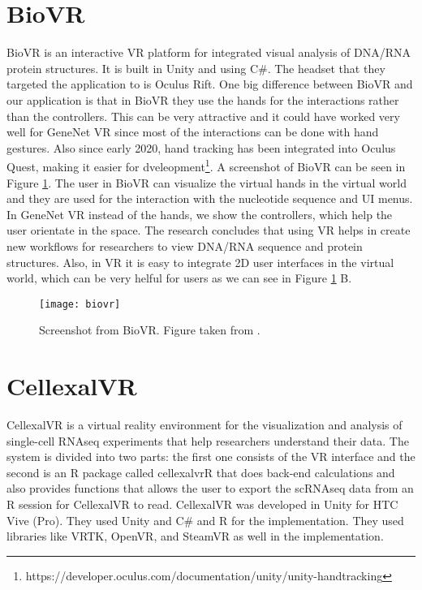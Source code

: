 \section{BioVR}
BioVR is an interactive VR platform for integrated visual analysis of DNA/RNA protein structures\cite{biovr}. It is built in Unity and using C\#. The headset that they targeted the application to is Oculus Rift. One big difference between BioVR and our application is that in BioVR they use the hands for the interactions rather than the controllers. This can be very attractive and it could have worked very well for GeneNet VR since most of the interactions can be done with hand gestures. Also since early 2020, hand tracking has been integrated into Oculus Quest, making it easier for dveleopment\footnote{https://developer.oculus.com/documentation/unity/unity-handtracking}.
A screenshot of BioVR can be seen in Figure \ref{fig:biovr}. The user in BioVR can visualize the virtual hands in the virtual world and they are used for the interaction with the nucleotide sequence and UI menus. In GeneNet VR instead of the hands, we show the controllers, which help the user orientate in the space. The research concludes that using VR helps in create new workflows for researchers to view DNA/RNA sequence and protein structures. Also, in VR it is easy to integrate 2D user interfaces in the virtual world, which can be very helful for users as we can see in Figure \ref{fig:biovr} B.

\begin{figure}[h!]
    \centering%
    \texttt{[image: biovr]}
    \caption{Screenshot from BioVR. Figure taken from \cite{biovr}.}
    \label{fig:biovr}
\end{figure}%

\section{CellexalVR}
CellexalVR is a virtual reality environment for the visualization and analysis of single-cell RNAseq experiments that help researchers understand their data\cite{cellexalvr}. The system is divided into two parts: the first one consists of the VR interface and the second is an R package called cellexalvrR that does back-end calculations and also provides functions that allows the user to export the scRNAseq data from an R session for CellexalVR to read. CellexalVR was developed in Unity for HTC Vive (Pro). They used Unity and C\# and R for the implementation. They used libraries like VRTK, OpenVR, and SteamVR as well in the implementation.

